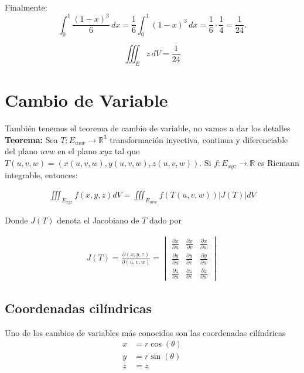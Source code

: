 \documentclass{article}
\theoremstyle{definition}
\begin{document}
Finalmente:
\[
\int_0^1 \frac{(1 - x)^3}{6} \, dx = \frac{1}{6} \int_0^1 (1 - x)^3 \, dx = \frac{1}{6} \cdot \frac{1}{4} = \frac{1}{24}.
\]

\[
\boxed{\iiint_E z \, dV = \frac{1}{24}}
\]



\section{Cambio de Variable}

Tambi\'en tenemos el teorema de cambio de variable, no vamos a dar los detalles \\

\textbf{Teorema: } Sea $T: E_{uvw} \to \mathbb{R}^3$ transformaci\'on inyectiva, continua y diferenciable del plano $uvw$ en el plano $xyz$ tal que
$T (u, v,w) = (x (u, v,w) , y (u, v,w) , z (u, v,w))$. Si
$f : E_{xyz} \to \mathbb{R}$ es Riemann integrable, entonces:

\begin{align*}
    \iiint_{E_{xyz}} f(x,y,z) dV = \iiint_{E_{uvw}} f(T(u,v,w))|J(T)|dV
\end{align*}

Donde $J(T)$ denota el Jacobiano de $T$ dado por 

\begin{align*}
    J(T) = \frac{\partial(x,y,z)}{\partial(u,v,w)} = \begin{vmatrix}
        \frac{\partial x}{\partial u} & \frac{\partial x}{\partial v}& \frac{\partial x}{\partial w} \\
        \frac{\partial y}{\partial u} & \frac{\partial y}{\partial v} & \frac{\partial y}{\partial w} \\
        \frac{\partial z}{\partial u} & \frac{\partial z}{\partial v} & \frac{\partial z}{\partial w}
    \end{vmatrix}
\end{align*}

\subsection{Coordenadas cil\'indricas}

Uno de los cambios de variables m\'as conocidos son las coordenadas cil\'indricas
\begin{align*}
    x &= r\cos(\theta) \\
    y &= r\sin(\theta) \\
    z &= z
\end{align*}
\end{document}
